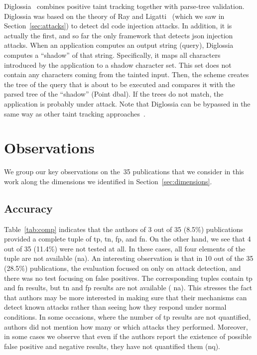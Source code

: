 \documentclass[conference]{IEEEtran}
\begin{document}
Diglossia~\cite{SMS13} combines positive taint tracking together
with parse-tree validation. Diglossia was based on the theory of Ray
and Ligatti~\cite{RL12b} (which we saw in Section~\ref{sec:attacks})
to detect {\sc dsl} code injection attacks. In addition, it is
actually the first, and so far the only framework that detects {\sc
  json} injection attacks. When an application computes an output
string (query), Diglossia computes a ``shadow'' of that string.
Specifically, it maps all characters introduced by the application to
a shadow character set. This set does not contain any characters
coming from the tainted input. Then, the scheme creates the tree of
the query that is about to be executed and compares it with the parsed
tree of the ``shadow'' (Point {\sc dbal}). If the trees do not match,
the application is probably under attack. Note that Diglossia
can be bypassed in the same way as other taint tracking
approaches~\cite{NBR14}.


\section{Observations}
\label{sec:discussion}

We group our key observations on the~35 publications that
we consider in this work along the
dimensions we identified in Section~\ref{sec:dimensions}.

\subsection{Accuracy}

Table~\ref{tab:comp} indicates that the authors of 3 out of 35 (8.5\%)
publications provided a complete tuple of {\sc tp}, {\sc tn}, 
{\sc fp}, and {\sc fn}. On the other hand, we
see that 4 out of 35 (11.4\%) were not tested at all.
In these cases, all four elements of the tuple
are not available ({\sc na}). An interesting observation is
that in 10 out of the 35 (28.5\%)
publications, the evaluation focused on only on attack detection,
and there was no test focusing on false positives.
The corresponding tuples contain {\sc tp} and {\sc fn}
results, but {\sc tn} and {\sc fp} results are not available ({\sc
  na}). This stresses the fact that authors may be more interested in
making sure that their mechanisms can detect known attacks rather than
seeing how they respond under normal conditions. In some occasions,
where the number of {\sc tp} results are not quantified, authors did
not mention how many or which attacks they performed. Moreover, in some
cases we observe that even if the authors report the existence of
possible false positive and negative results, they have not quantified
them ({\sc nq}).
\end{document}
